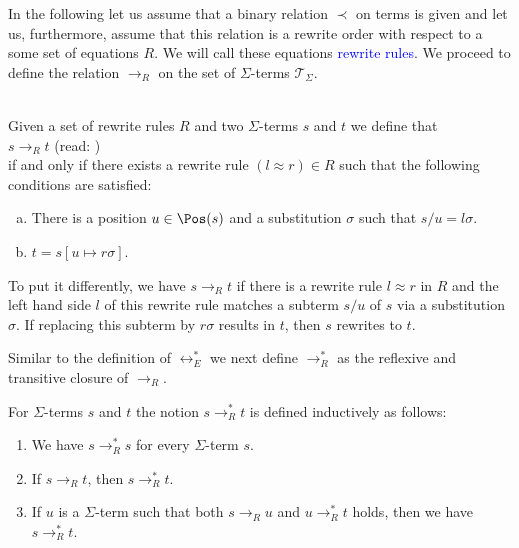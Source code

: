 In the following let us assume that a binary relation $\prec$ on terms is given and let us, furthermore, assume
that this relation is a rewrite order with respect to a some set of equations $R$.  We will call these equations
\textcolor{blue}{rewrite rules}.  We proceed to define the relation $\rightarrow_R$ on the set of $\Sigma$-terms $\mathcal{T}_\Sigma$. 

\begin{Definition} \hspace*{\fill} \\
  Given a set of rewrite rules $R$ and two $\Sigma$-terms $s$ and $t$ we define that
  \\[0.2cm]
  \hspace*{1.3cm}
  $s \rightarrow_R t$ \quad (read: )
  \\[0.2cm]
  if and only if there exists a rewrite rule $(l \approx r) \in R$ such that the following conditions are satisfied:
  \begin{enumerate}[(a)]
  \item There is a position $u \in \Pos(s)$ and a substitution $\sigma$ such that $s/u = l\sigma$.
  \item $t = s[u \mapsto r\sigma]$. \eox
  \end{enumerate}
\end{Definition}

To put it differently, we have $s \rightarrow_R t$ if there is a rewrite rule $l \approx r$ in $R$ and the left hand
side $l$ of this rewrite rule matches a subterm $s/u$ of $s$ via a substitution $\sigma$.  If replacing this
subterm by $r\sigma$ results in $t$, then $s$ rewrites to $t$.

Similar to the definition of $\leftrightarrow_E^*$  we next define $\rightarrow_R^*$ as the reflexive and transitive closure of $\rightarrow_R$.
\begin{Definition}[$\rightarrow_R^*$]
  For $\Sigma$-terms $s$ and $t$ the notion $s \rightarrow_R^* t$ is defined inductively as follows:
  \begin{enumerate}
  \item We have $s \rightarrow_R^* s$ for every $\Sigma$-term $s$.
  \item If $s \rightarrow_R t$, then $s \rightarrow_R^* t$.
  \item If $u$ is a $\Sigma$-term such that both $s \rightarrow_R u$ and $u \rightarrow_R^* t$ holds,
        then we have $s \rightarrow_R^* t$. \eod
  \end{enumerate}
\end{Definition}

